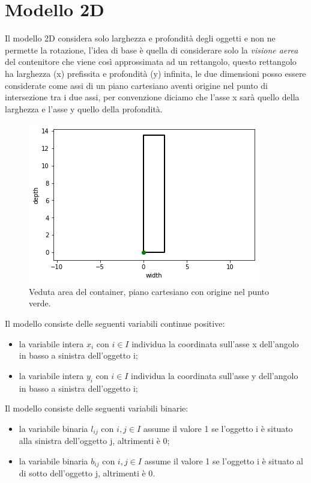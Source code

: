 \section{Modello 2D}
Il modello 2D considera solo larghezza e profondità degli oggetti e non ne permette la rotazione, l'idea di base è quella di considerare solo la \textit{visione aerea} del contenitore che viene così approssimata ad un rettangolo, questo rettangolo ha larghezza (x) prefissita e profondità (y) infinita, le due dimensioni posso essere considerate come assi di un piano cartesiano aventi origine nel punto di intersezione tra i due assi, per convenzione diciamo che l'asse x sarà quello della larghezza e l'asse y quello della profondità.\\
\begin{figure}[!h]
	\begin{center} \includegraphics[scale=0.6]{figures/cartesian_wd}
		\caption[Veduta area - piano cartesiano]{Veduta area del container, piano cartesiano con origine nel punto verde.}  
		\label{fig:myInlineFigure}
	\end{center}
\end{figure}

\noindent Il modello consiste delle seguenti variabili continue positive:
\begin{itemize}
	\item la variabile intera $x_{i}$ con $i \in I$ individua la coordinata sull'asse x dell'angolo in basso a sinistra dell'oggetto i;
	\item la variabile intera $y_{i}$ con $i \in I$ individua la coordinata sull'asse y dell'angolo in basso a sinistra dell'oggetto i;
\end{itemize}
Il modello consiste delle seguenti variabili binarie:
\begin{itemize}
	\item la variabile binaria $l_{ij}$ con $i,j \in I$ assume il valore 1 se l'oggetto i è situato alla sinistra dell'oggetto j, altrimenti è 0;
	\item la variabile binaria $b_{ij}$ con $i,j \in I$ assume il valore 1 se l'oggetto i è situato al di sotto dell'oggetto j, altrimenti è 0.
\end{itemize}

